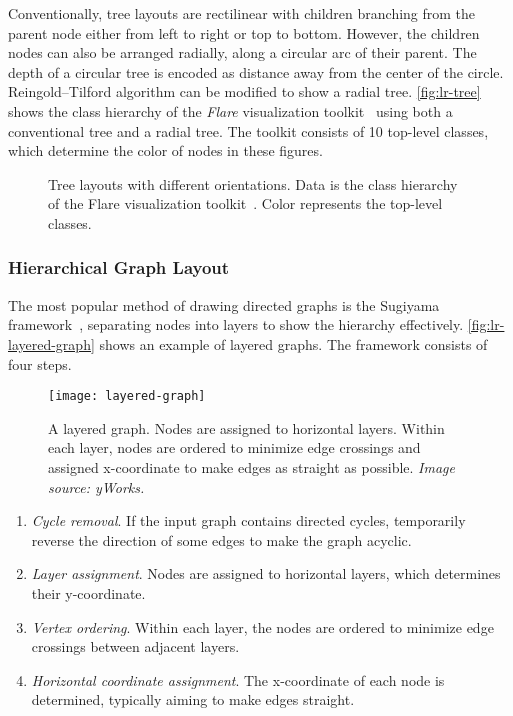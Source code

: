 Conventionally, tree layouts are rectilinear with children branching from the parent node either from left to right or top to bottom. However, the children nodes can also be arranged radially, along a circular arc of their parent. The depth of a circular tree is encoded as distance away from the center of the circle. Reingold--Tilford algorithm can be modified to show a radial tree. \autoref{fig:lr-tree} shows the class hierarchy of the \emph{Flare} visualization toolkit~\cite{Heer2009b} using both a conventional tree and a radial tree. The toolkit consists of 10 top-level classes, which determine the color of nodes in these figures.

\begin{figure}[!htb]
\centering
{}
\hfill
{}
\caption{Tree layouts with different orientations. Data is the class hierarchy of the Flare visualization toolkit~\cite{Heer2009b}. Color represents the top-level classes.}
\label{fig:lr-tree}
\end{figure}
  
\subsubsection{Hierarchical Graph Layout}	
The most popular method of drawing directed graphs is the Sugiyama framework~\cite{Sugiyama1981}, separating nodes into layers to show the hierarchy effectively. \autoref{fig:lr-layered-graph} shows an example of layered graphs. The framework consists of four steps.

\begin{figure}[!htb]
	\centering
	\texttt{[image: layered-graph]}
	\caption{A layered graph. Nodes are assigned to horizontal layers. Within each layer, nodes are ordered to minimize edge crossings and assigned x-coordinate to make edges as straight as possible. \textrm{\emph{Image source: yWorks.}}}
	\label{fig:lr-layered-graph}
\end{figure}

\begin{enumerate}
	\item \emph{Cycle removal}. If the input graph contains directed cycles, temporarily reverse the direction of some edges to make the graph acyclic.
	\item \emph{Layer assignment}. Nodes are assigned to horizontal layers, which determines their y-coordinate.
	\item \emph{Vertex ordering}. Within each layer, the nodes are ordered to minimize edge crossings between adjacent layers.
	\item \emph{Horizontal coordinate assignment}. The x-coordinate of each node is determined, typically aiming to make edges straight.
\end{enumerate}

